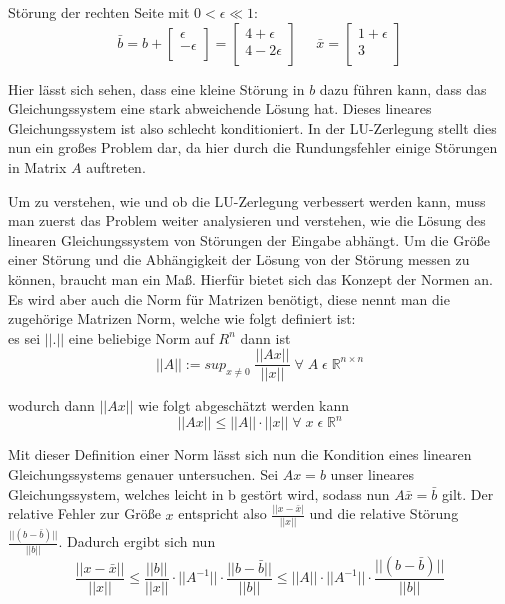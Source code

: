 \documentclass[course=erap]{aspdoc}
\begin{document}
Störung der rechten Seite mit $ 0 < \epsilon \ll 1$:
  \begin{equation}
    \label{absBeis2}
    \bar{b} = b + 
    \begin{bmatrix}
    \epsilon \\
    -\epsilon\\
    \end{bmatrix}
    = \begin{bmatrix}
    4 + \epsilon\\
    4- 2\epsilon\\
    \end{bmatrix}
    \;\;\;\;\;
    \bar{x} = 
    \begin{bmatrix}
    1 + \epsilon \\
    3\\
    \end{bmatrix}
  \end{equation}

Hier lässt sich sehen, dass eine kleine Störung in $b$ dazu führen kann, 
dass das Gleichungssystem eine stark abweichende Lösung hat.
Dieses lineares Gleichungssystem ist also schlecht konditioniert. In der LU-Zerlegung stellt dies nun ein großes 
Problem dar, da hier durch die Rundungsfehler einige Störungen in Matrix $A$ auftreten.

Um zu verstehen, wie und ob die LU-Zerlegung verbessert werden kann, muss man 
zuerst das Problem weiter analysieren und verstehen, wie die Lösung des linearen 
Gleichungssystem von Störungen der Eingabe abhängt. 
Um die Größe einer Störung und die Abhängigkeit der Lösung von der Störung messen zu 
können, braucht man ein Maß. Hierfür bietet sich das Konzept der Normen an. Es wird aber 
auch die Norm für Matrizen benötigt, diese nennt man die zugehörige Matrizen Norm, 
welche wie folgt definiert ist: \\
es sei $||.||$ eine beliebige Norm auf $R^n$ dann ist  
  \begin{equation}
    \label{norm}
    ||A|| := sup_{x\neq 0}\;\frac{||Ax||}{||x||}\; \forall\; A \;\epsilon \;\mathbb{R}^{n \times n}
  \end{equation}

wodurch dann $||Ax||$ wie folgt abgeschätzt werden kann
  \begin{equation}
    \label{norm}
    ||Ax|| \leq ||A|| \cdot ||x||\;  \forall\; x \;\epsilon \;\mathbb{R}^n 
  \end{equation}

Mit dieser Definition einer Norm lässt sich nun die Kondition eines linearen 
Gleichungssystems genauer untersuchen. Sei $Ax=b$ unser lineares Gleichungssystem, 
welches leicht in b gestört wird, sodass nun $A \bar{x}=\bar{b}$ gilt.
Der relative Fehler zur Größe $x$ entspricht also 
$\frac{||x-\bar{x}|}{||x||}$ und die relative Störung 
$\frac{||(b-\bar{b})||}{||b||}$. Dadurch ergibt sich nun 
  \begin{equation}
    \label{norm}
    \frac{||x- \bar{x}||}{||x||}   \leq    \frac{||b||} {||x||} \cdot ||A^{-1}|| \cdot \frac{||b-\bar{b}||}{||b||} \leq ||A|| \cdot ||A^{-1}|| \cdot \frac{||(b-\bar{b})||} {||b||}
  \end{equation}
 
\end{document}
